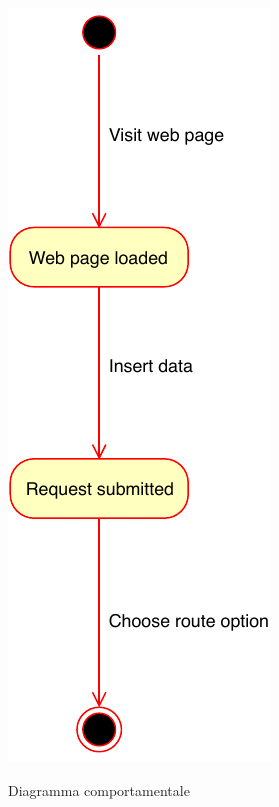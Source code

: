 \begin{figure}[htb]
\centering
{\includegraphics[scale=1]{Immagini/Automa_stati_finiti.pdf}}
\caption{Diagramma comportamentale}
\end{figure}
